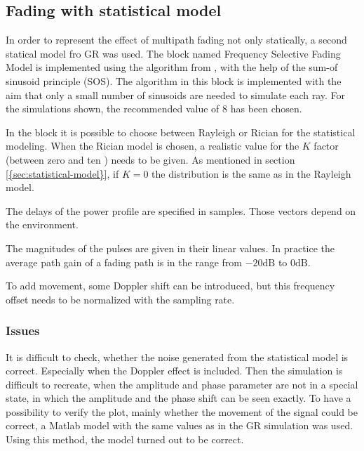 \subsection{Fading with statistical model}

In order to represent the effect of multipath fading not only statically, a second statical model fro GR was used. The block named Frequency Selective Fading Model is implemented using the algorithm from \cite{Alimohammad2009}, with the help of the sum-of sinusoid principle (SOS). The algorithm in this block is implemented with the aim that only a small number of sinusoids are needed to simulate each ray. For the simulations shown, the recommended value of 8 has been chosen.

In the block it is possible to choose between Rayleigh or Rician for the statistical modeling. When the Rician model is chosen, a realistic value for the \(K\) factor (between zero and ten \cite{Mathworks}) needs to be given. As mentioned in section \ref{{sec:statistical-model}}, if \(K=0\) the distribution is the same as in the Rayleigh model. 

The delays of the power profile are specified in samples. Those vectors depend on the environment. 

The magnitudes of the pulses are given in their linear values. In practice the average path gain of a fading path is in the range from \( -20 \text{dB}\) to   \(0\text{dB}\).

To add movement, some Doppler shift can be introduced, but this frequency offset needs to be normalized with the sampling rate. 




\subsubsection{Issues}

It is difficult to check, whether the noise generated from the statistical model is correct. Especially when the Doppler effect is included. Then the simulation is difficult to recreate, when the amplitude and phase parameter are not in a special state, in which the amplitude and the phase shift can be seen exactly. 
To have a possibility to verify the plot, mainly whether the movement of the signal could be correct, a Matlab model with the same values as in the GR simulation was used. Using this method, the model turned out to be correct.

